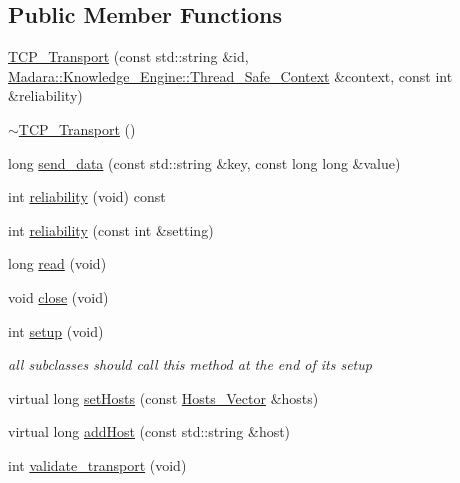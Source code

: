 \subsection*{Public Member Functions}
\begin{DoxyCompactItemize}
\item 
\hyperlink{classMadara_1_1Transport_1_1TCP__Transport_aead9acbaf54d54c8b0843c4e405a2ffa}{TCP\_\-Transport} (const std::string \&id, \hyperlink{classMadara_1_1Knowledge__Engine_1_1Thread__Safe__Context}{Madara::Knowledge\_\-Engine::Thread\_\-Safe\_\-Context} \&context, const int \&reliability)
\item 
\hyperlink{classMadara_1_1Transport_1_1TCP__Transport_a332e1cc8620fe59abb7a11f3c15c0c70}{$\sim$TCP\_\-Transport} ()
\item 
long \hyperlink{classMadara_1_1Transport_1_1TCP__Transport_a6d6342f5e93fdf3f8915bdb1c02a34f2}{send\_\-data} (const std::string \&key, const long long \&value)
\item 
int \hyperlink{classMadara_1_1Transport_1_1TCP__Transport_a8eed0052fce42705a1f1733ec03a1c64}{reliability} (void) const 
\item 
int \hyperlink{classMadara_1_1Transport_1_1TCP__Transport_afd7b8f4e26fbb63d9c011e138f1ecd6c}{reliability} (const int \&setting)
\item 
long \hyperlink{classMadara_1_1Transport_1_1TCP__Transport_ad172a1444c1d0a84831b16ac33c29708}{read} (void)
\item 
void \hyperlink{classMadara_1_1Transport_1_1TCP__Transport_a1ebce86fb48cd504de1781202396e549}{close} (void)
\item 
int \hyperlink{classMadara_1_1Transport_1_1TCP__Transport_a689bff9ec1a91d4a550c96b9f6c17517}{setup} (void)
\begin{DoxyCompactList}\small\item\em all subclasses should call this method at the end of its setup \item\end{DoxyCompactList}\item 
virtual long \hyperlink{classMadara_1_1Transport_1_1Base_aede3e2606396c38455966e155875976d}{setHosts} (const \hyperlink{classMadara_1_1Transport_1_1Base_a2957ae0c413e07b7e276ae69ef1c320a}{Hosts\_\-Vector} \&hosts)
\item 
virtual long \hyperlink{classMadara_1_1Transport_1_1Base_ad2d54b9bb188231988a7e7ac89976d30}{addHost} (const std::string \&host)
\item 
int \hyperlink{classMadara_1_1Transport_1_1Base_a6d31f20d785b8b5a798c20db3975247b}{validate\_\-transport} (void)

\end{DoxyCompactItemize}
